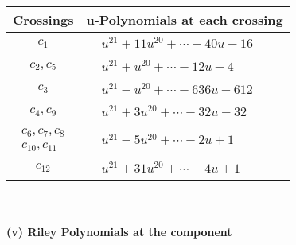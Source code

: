 \documentclass[1p]{elsarticle_modified}
\theoremstyle{definition}
\begin{document}
\begin{tabular}{m{50pt}|m{274pt}}
Crossings & \hspace{64pt}u-Polynomials at each crossing \\
\hline $$\begin{aligned}c_{1}\end{aligned}$$&$\begin{aligned}
&u^{21}+11 u^{20}+\cdots+40 u-16
\end{aligned}$\\
\hline $$\begin{aligned}c_{2},c_{5}\end{aligned}$$&$\begin{aligned}
&u^{21}+u^{20}+\cdots-12 u-4
\end{aligned}$\\
\hline $$\begin{aligned}c_{3}\end{aligned}$$&$\begin{aligned}
&u^{21}- u^{20}+\cdots-636 u-612
\end{aligned}$\\
\hline $$\begin{aligned}c_{4},c_{9}\end{aligned}$$&$\begin{aligned}
&u^{21}+3 u^{20}+\cdots-32 u-32
\end{aligned}$\\
\hline $$\begin{aligned}c_{6},c_{7},c_{8}\\c_{10},c_{11}\end{aligned}$$&$\begin{aligned}
&u^{21}-5 u^{20}+\cdots-2 u+1
\end{aligned}$\\
\hline $$\begin{aligned}c_{12}\end{aligned}$$&$\begin{aligned}
&u^{21}+31 u^{20}+\cdots-4 u+1
\end{aligned}$\\
\hline
\end{tabular}\\~\\
\newpage\renewcommand{\arraystretch}{1}
\flushleft \textbf{(v) Riley Polynomials at the component}\newline \\
\end{document}
